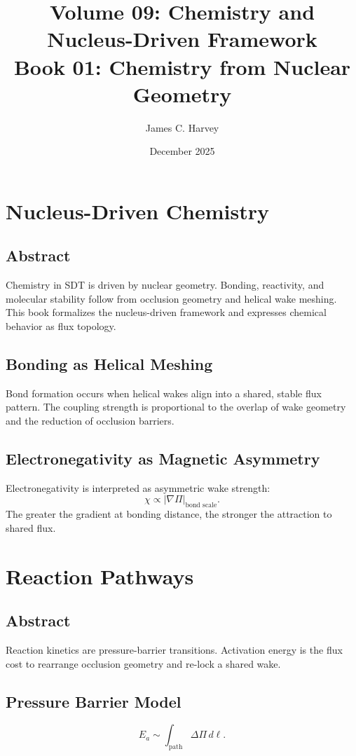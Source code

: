 \documentclass[12pt]{book}
\title{Volume 09: Chemistry and Nucleus-Driven Framework \\ Book 01: Chemistry from Nuclear Geometry}
\author{James C. Harvey}
\date{December 2025}
\begin{document}
\maketitle
\tableofcontents

\chapter{Nucleus-Driven Chemistry}

\section*{Abstract}
Chemistry in SDT is driven by nuclear geometry. Bonding, reactivity, and molecular stability follow
from occlusion geometry and helical wake meshing. This book formalizes the nucleus-driven framework and
expresses chemical behavior as flux topology.

\section{Bonding as Helical Meshing}
Bond formation occurs when helical wakes align into a shared, stable flux pattern. The coupling strength
is proportional to the overlap of wake geometry and the reduction of occlusion barriers.

\section{Electronegativity as Magnetic Asymmetry}
Electronegativity is interpreted as asymmetric wake strength:
\begin{equation}
\chi \propto \left|\nabla \Pi\right|_{\text{bond scale}}.
\end{equation}
The greater the gradient at bonding distance, the stronger the attraction to shared flux.

\chapter{Reaction Pathways}

\section*{Abstract}
Reaction kinetics are pressure-barrier transitions. Activation energy is the flux cost to rearrange
occlusion geometry and re-lock a shared wake.

\section{Pressure Barrier Model}
\begin{equation}
E_a \sim \int_{\text{path}} \Delta \Pi \, d\ell.
\end{equation}
\end{document}
